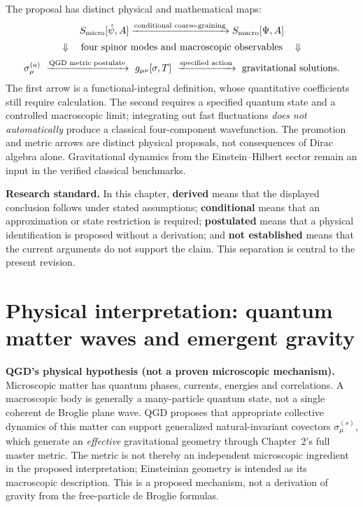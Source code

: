 \documentclass[11pt,a4paper]{article}
\begin{document}
The proposal has distinct physical and mathematical maps:
\begin{equation}\label{eq:three-maps}
\begin{gathered}
 S_{\rm micro}[\hat\psi,A]
 \xrightarrow{\text{conditional coarse-graining}}
 S_{\rm macro}[\Psi,A]\\[2pt]
 \Downarrow\quad\text{four spinor modes and macroscopic observables}\quad\Downarrow\\[2pt]
 \sigma^{(a)}_\mu\ \xrightarrow{\text{QGD metric postulate}}\
 g_{\mu\nu}[\sigma,T]\ \xrightarrow{\text{specified action}}\
 \text{gravitational solutions}.
\end{gathered}
\end{equation}
The first arrow is a functional-integral definition, whose quantitative coefficients still require calculation. The second requires a specified quantum state and a controlled macroscopic limit; integrating out fast fluctuations \emph{does not automatically} produce a classical four-component wavefunction. The promotion and metric arrows are distinct physical proposals, not consequences of Dirac algebra alone. Gravitational dynamics from the Einstein--Hilbert sector remain an input in the verified classical benchmarks.

\noindent\textbf{Research standard.} In this chapter, \textbf{derived} means that the displayed conclusion follows under stated assumptions; \textbf{conditional} means that an approximation or state restriction is required; \textbf{postulated} means that a physical identification is proposed without a derivation; and \textbf{not established} means that the current arguments do not support the claim. This separation is central to the present revision.


\section{Physical interpretation: quantum matter waves and emergent gravity}\label{sec:qgd-physical-heart}
\noindent\textbf{QGD's physical hypothesis (not a proven microscopic mechanism).}
Microscopic matter has quantum phases, currents, energies and correlations.  A macroscopic body is generally a many-particle quantum state, not a single coherent de Broglie plane wave.  QGD proposes that appropriate collective dynamics of this matter can support generalized natural-invariant covectors $\sigma_\mu^{(s)}$, which generate an \emph{effective} gravitational geometry through Chapter~2's full master metric.  The metric is not thereby an independent microscopic ingredient in the proposed interpretation; Einsteinian geometry is intended as its macroscopic description.  This is a proposed mechanism, not a derivation of gravity from the free-particle de Broglie formulas.
\end{document}
